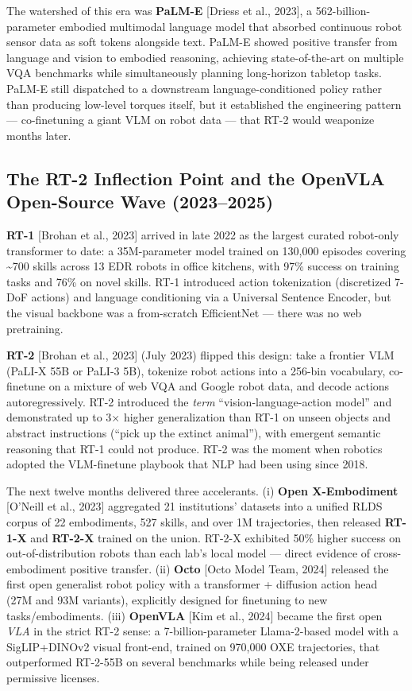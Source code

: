 The watershed of this era was \textbf{PaLM-E} {[}Driess et al., 2023{]}, a 562-billion-parameter embodied multimodal language model that absorbed continuous robot sensor data as soft tokens alongside text. PaLM-E showed positive transfer from language and vision to embodied reasoning, achieving state-of-the-art on multiple VQA benchmarks while simultaneously planning long-horizon tabletop tasks. PaLM-E still dispatched to a downstream language-conditioned policy rather than producing low-level torques itself, but it established the engineering pattern --- co-finetuning a giant VLM on robot data --- that RT-2 would weaponize months later.

\subsection{The RT-2 Inflection Point and the OpenVLA Open-Source Wave (2023--2025)}\label{the-rt-2-inflection-point-and-the-openvla-open-source-wave-20232025}

\textbf{RT-1} {[}Brohan et al., 2023{]} arrived in late 2022 as the largest curated robot-only transformer to date: a 35M-parameter model trained on 130,000 episodes covering \textasciitilde700 skills across 13 EDR robots in office kitchens, with 97\% success on training tasks and 76\% on novel skills. RT-1 introduced action tokenization (discretized 7-DoF actions) and language conditioning via a Universal Sentence Encoder, but the visual backbone was a from-scratch EfficientNet --- there was no web pretraining.

\textbf{RT-2} {[}Brohan et al., 2023{]} (July 2023) flipped this design: take a frontier VLM (PaLI-X 55B or PaLI-3 5B), tokenize robot actions into a 256-bin vocabulary, co-finetune on a mixture of web VQA and Google robot data, and decode actions autoregressively. RT-2 introduced the \emph{term} ``vision-language-action model'' and demonstrated up to 3× higher generalization than RT-1 on unseen objects and abstract instructions (``pick up the extinct animal''), with emergent semantic reasoning that RT-1 could not produce. RT-2 was the moment when robotics adopted the VLM-finetune playbook that NLP had been using since 2018.

The next twelve months delivered three accelerants. (i) \textbf{Open X-Embodiment} {[}O'Neill et al., 2023{]} aggregated 21 institutions' datasets into a unified RLDS corpus of 22 embodiments, 527 skills, and over 1M trajectories, then released \textbf{RT-1-X} and \textbf{RT-2-X} trained on the union. RT-2-X exhibited 50\% higher success on out-of-distribution robots than each lab's local model --- direct evidence of cross-embodiment positive transfer. (ii) \textbf{Octo} {[}Octo Model Team, 2024{]} released the first open generalist robot policy with a transformer + diffusion action head (27M and 93M variants), explicitly designed for finetuning to new tasks/embodiments. (iii) \textbf{OpenVLA} {[}Kim et al., 2024{]} became the first open \emph{VLA} in the strict RT-2 sense: a 7-billion-parameter Llama-2-based model with a SigLIP+DINOv2 visual front-end, trained on 970,000 OXE trajectories, that outperformed RT-2-55B on several benchmarks while being released under permissive licenses.


